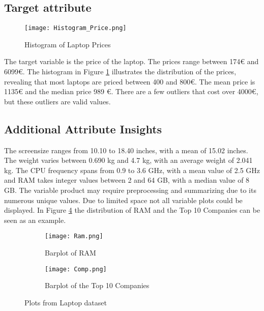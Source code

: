 \documentclass{article}
\begin{document}
\vspace{-8pt}
\subsection{Target attribute}
\vspace{-8pt}
\begin{figure}[H]
\centering
\texttt{[image: Histogram\_Price.png]}
\caption{\label{fig:hist:price} Histogram of Laptop Prices}
\end{figure}
\vspace{-10pt}
The target variable is the price of the laptop. The prices range between 174€ and 6099€. The histogram in Figure \ref{fig:hist:price} illustrates the distribution of the prices, revealing that most laptops are priced between 400 and 800€. The mean price is 1135€ and the median price 989 €. There are a few outliers that cost over 4000€, but these outliers are valid values. 

\vspace{-8pt}
\subsection{Additional Attribute Insights}
\vspace{-6pt}
The screensize ranges from 10.10 to 18.40 inches, with a mean of 15.02 inches. The weight varies between 0.690 kg and 4.7 kg, with an average weight of 2.041 kg. The CPU frequency spans from 0.9 to 3.6 GHz, with a mean value of 2.5 GHz and RAM takes integer values between 2 and 64 GB, with a median value of 8 GB. The variable product may require preprocessing and summarizing due to its numerous unique values. \newline
Due to limited space not all variable plots could be displayed. In Figure \ref{fig:Laptop} the distribution of RAM and the Top 10 Companies can be seen as an example.
\begin{figure}[H]
  \centering
  \begin{subfigure}[b]{0.45\textwidth}
    \texttt{[image: Ram.png]}
    \caption{Barplot of RAM}
    \label{fig:ram}
  \end{subfigure}
  \hfill
  \begin{subfigure}[b]{0.45\textwidth}
    \texttt{[image: Comp.png]}
    \caption{Barplot of the Top 10 Companies}
    \label{fig:company}
  \end{subfigure}
  \caption{Plots from Laptop dataset}
\label{fig:Laptop}
\end{figure}
\end{document}
